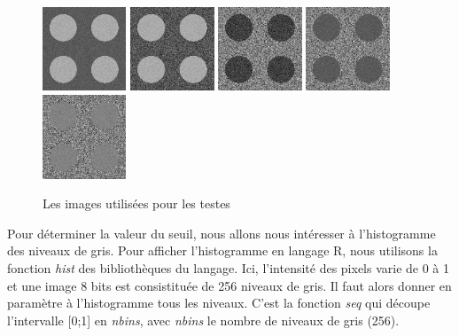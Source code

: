 \documentclass[11pt]{article}
\begin{document}
  \begin{figure}[H]
    \center
    \includegraphics[width=2.5cm]{texture-0/texture-0.png}
    \includegraphics[width=2.5cm]{texture-1/texture-1.png}
    \includegraphics[width=2.5cm]{texture-2/texture-2.png}
    \includegraphics[width=2.5cm]{texture-3/texture-3.png}
    \includegraphics[width=2.5cm]{texture-4/texture-4.png}
    \caption{Les images utilisées pour les testes}
  \end{figure}
  
  Pour déterminer la valeur du seuil, nous allons nous intéresser à l'histogramme des niveaux de gris. Pour 
  afficher l'histogramme en langage R, nous utilisons la fonction \textit{hist} des bibliothèques du langage.
  Ici, l'intensité des pixels varie de 0 à 1 et une image 8 bits est consistituée de 256 niveaux de gris.
  Il faut alors donner en paramètre à l'histogramme tous les niveaux. C'est la fonction \textit{seq} qui
  découpe l'intervalle [0;1] en \textit{nbins}, avec \textit{nbins} le nombre de niveaux de gris (256).\\
  
\end{document}

